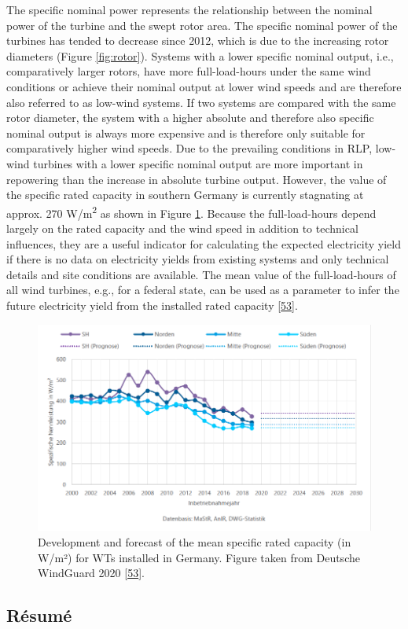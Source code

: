 \documentclass[a4paper,11pt]{article}
\begin{document}
The specific nominal power represents the relationship between the nominal power of the turbine and the swept rotor area. The specific nominal power of the turbines has tended to decrease since 2012, which is due to the increasing rotor diameters (Figure \ref{fig:rotor}). Systems with a lower specific nominal output, i.e., comparatively larger rotors, have more full-load-hours under the same wind conditions or achieve their nominal output at lower wind speeds and are therefore also referred to as low-wind systems. If two systems are compared with the same rotor diameter, the system with a higher absolute and therefore also specific nominal output is always more expensive and is therefore only suitable for comparatively higher wind speeds. Due to the prevailing conditions in RLP, low-wind turbines with a lower specific nominal output are more important in repowering than the increase in absolute turbine output. However, the value of the specific rated capacity in southern Germany is currently stagnating at approx. 270 W/m\textsuperscript{2} as shown in Figure \ref{fig:spec}. Because the full-load-hours depend largely on the rated capacity and the wind speed in addition to technical influences, they are a useful indicator for calculating the expected electricity yield if there is no data on electricity yields from existing systems and only technical details and site conditions are available. The mean value of the full-load-hours of all wind turbines, e.g., for a federal state, can be used as a parameter to infer the future electricity yield from the installed rated capacity {[}\protect\hyperlink{ref-RasmusBorrmannDr.KnudRehfeldtDr.DennisKruse.2020}{53}{]}.
\begin{figure}[H]

{\centering \includegraphics[width=1\linewidth]{figures/DWG/DWG_Spezifische_Nennleistung} 

}

\caption{Development and forecast of the mean specific rated capacity (in W/m²) for WTs installed in Germany. Figure taken from Deutsche WindGuard 2020 {[}\protect\hyperlink{ref-RasmusBorrmannDr.KnudRehfeldtDr.DennisKruse.2020}{53}{]}.}\label{fig:spec}
\end{figure}
\hypertarget{ruxe9sumuxe9}{%
\subsection{Résumé}\label{ruxe9sumuxe9}}
\end{document}
